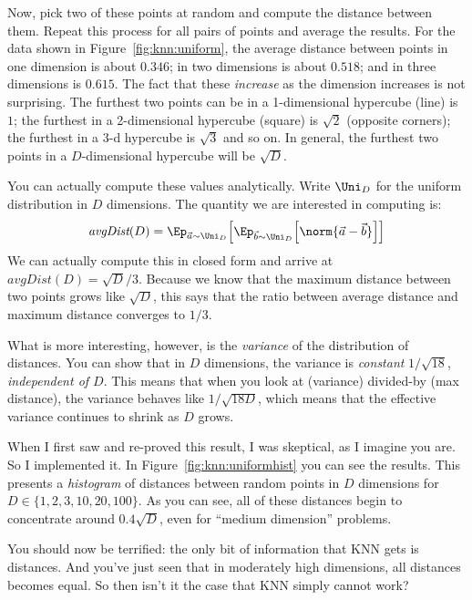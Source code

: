 Now, pick two of these points at random and compute the distance
between them.  Repeat this process for all pairs of points and average
the results.  For the data shown in Figure~\ref{fig:knn:uniform}, the
average distance between points in one dimension is about $0.346$; in two
dimensions is about $0.518$; and in three dimensions is $0.615$. The fact that these \emph{increase} as the dimension increases is not surprising. The furthest two points can be in a 1-dimensional hypercube (line) is $1$; the furthest in a 2-dimensional hypercube (square) is $\sqrt 2$ (opposite corners); the furthest in a 3-d hypercube is $\sqrt 3$ and so on. In general, the furthest two points in a $D$-dimensional hypercube will be $\sqrt D$.

You can actually compute these values analytically.  Write $\Uni_D$ for
the uniform distribution in $D$ dimensions.  The quantity we are
interested in computing is:
\begin{equation} \label{eq:knn:dist}
  \textit{avgDist}(D)
  = \Ep_{\vec a \sim \Uni_D} \Big[
    \Ep_{\vec b \sim \Uni_D} \Big[
      \norm{\vec a - \vec b}
      \Big] \Big]
\end{equation}
We can actually compute this in closed form and arrive
at $\textit{avgDist}(D) = \sqrt D / 3$. Because we know that the maximum distance between two points grows like $\sqrt D$, this says that the ratio between average distance and maximum distance converges to $1/3$.

What is more interesting, however, is the \emph{variance} of the distribution of distances. You can show that in $D$ dimensions, the variance is \emph{constant} $1/\sqrt{18}$, \emph{independent of $D$}. This means that when you look at (variance) divided-by (max distance), the variance behaves like $1/\sqrt{18 D}$, which means that the effective variance continues to shrink as $D$ grows.


When I first saw and re-proved this result, I was skeptical, as I
imagine you are.  So I implemented it.  In
Figure~\ref{fig:knn:uniformhist} you can see the results.  This
presents a \emph{histogram} of distances between random points in $D$
dimensions for $D \in \{1,2,3,10,20,100\}$.  As you can see, all of
these distances begin to concentrate around $0.4\sqrt{D}$, even for ``medium
dimension'' problems.

You should now be terrified: the only bit of information that KNN gets
is distances.  And you've just seen that in moderately high dimensions,
all distances becomes equal.  So then isn't it the case that KNN
simply cannot work?


